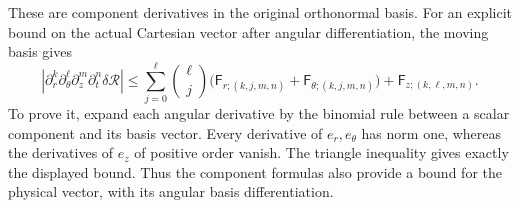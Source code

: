 These are component derivatives in the original orthonormal basis.
For an explicit bound on the actual Cartesian vector after angular
differentiation, the moving basis gives
\[
 \left|\partial_r^k\partial_\theta^\ell\partial_z^m\partial_t^n
                 \delta\mathcal R\right|
 \le\sum_{j=0}^\ell\binom\ell j
       \bigl(\mathsf F_{r;(k,j,m,n)}
             +\mathsf F_{\theta;(k,j,m,n)}\bigr)
       +\mathsf F_{z;(k,\ell,m,n)}.
\]
To prove it, expand each angular derivative by the binomial rule
between a scalar component and its basis vector. Every derivative of
\(e_r,e_\theta\) has norm one, whereas the derivatives of \(e_z\)
of positive order vanish. The triangle inequality gives exactly the
displayed bound. Thus the component formulas also provide a bound
for the physical vector, with its angular basis differentiation.

